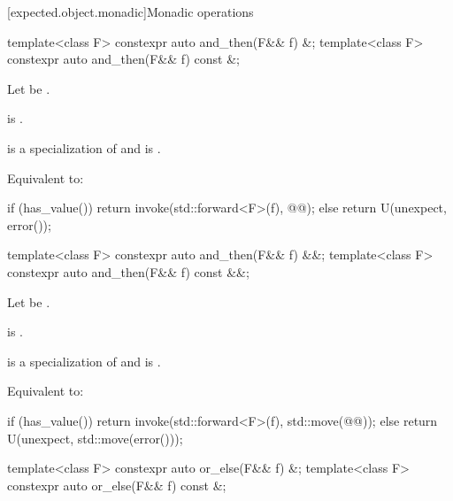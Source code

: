 [expected.object.monadic]{Monadic operations}

%
\begin{itemdecl}
template<class F> constexpr auto and_then(F&& f) &;
template<class F> constexpr auto and_then(F&& f) const &;
\end{itemdecl}

\begin{itemdescr}
\pnum
Let  be .

\pnum
\constraints
{} is .

\pnum
\mandates
{} is a specialization of  and
 is .

\pnum
\effects
Equivalent to:
\begin{codeblock}
if (has_value())
  return invoke(std::forward<F>(f), @@);
else
  return U(unexpect, error());
\end{codeblock}
\end{itemdescr}

%
\begin{itemdecl}
template<class F> constexpr auto and_then(F&& f) &&;
template<class F> constexpr auto and_then(F&& f) const &&;
\end{itemdecl}

\begin{itemdescr}
\pnum
Let  be
.

\pnum
\constraints
{} is .

\pnum
\mandates
{} is a specialization of  and
 is .

\pnum
\effects
Equivalent to:
\begin{codeblock}
if (has_value())
  return invoke(std::forward<F>(f), std::move(@@));
else
  return U(unexpect, std::move(error()));
\end{codeblock}
\end{itemdescr}

%
\begin{itemdecl}
template<class F> constexpr auto or_else(F&& f) &;
template<class F> constexpr auto or_else(F&& f) const &;
\end{itemdecl}

